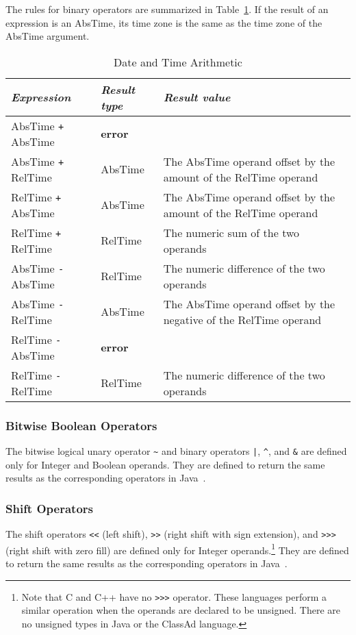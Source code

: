 \documentclass{article}
\begin{document}
The rules for binary operators are summarized in Table~\ref{tab:datearith}.
If the result of an expression is an AbsTime, its time zone is the same as
the time zone of the AbsTime argument.
\begin{table}[ht]
\begin{center}
\begin{tabular}{llp{4in}}
\emph{Expression} & \emph{Result type} & \emph{Result value} \\ \hline
AbsTime \verb|+| AbsTime & \textbf{error} \\
AbsTime \verb|+| RelTime & AbsTime & The AbsTime operand offset by the amount
                        of the RelTime operand \\
RelTime \verb|+| AbsTime & AbsTime & The AbsTime operand offset by the amount
                        of the RelTime operand \\
RelTime \verb|+| RelTime & RelTime & The numeric sum of the two operands \\

AbsTime \verb|-| AbsTime & RelTime & The numeric difference
                        of the two operands \\
AbsTime \verb|-| RelTime & AbsTime & The AbsTime operand offset by the negative
                        of the RelTime operand \\
RelTime \verb|-| AbsTime & \textbf{error} \\
RelTime \verb|-| RelTime & RelTime & The numeric difference of the two operands
\end{tabular}
\end{center}
\caption{Date and Time Arithmetic}
\label{tab:datearith}
\end{table}

\subsubsection{Bitwise Boolean Operators}
The bitwise logical unary operator \verb|~| and binary operators
\verb/|/,
\verb|^|, and
\verb|&| are defined only for Integer and Boolean operands.
They are defined to return the same results as the corresponding operators in
Java~\cite{JLS}.

\subsubsection{Shift Operators}
The shift operators
\verb/<</ (left shift),
\verb|>>| (right shift with sign extension), and
\verb|>>>| (right shift with zero fill) are defined only for Integer
operands.\footnote{Note that C and C++ have no \texttt{>>>} operator.  These
languages perform a similar operation when the operands are declared to be
unsigned.
There are no unsigned types in Java or the ClassAd language.}
They are defined to return the same results as the corresponding operators in
Java~\cite{JLS}.
\end{document}

